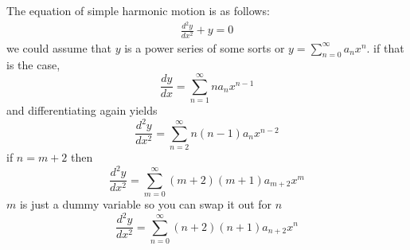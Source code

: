 \documentclass[12pt]{article}
\begin{document}
The equation of simple harmonic motion is as follows:
\begin{align*}
    \frac{d^2 y}{d x^2} + y = 0
\end{align*}
we could assume that $y$ is a power series of some sorts or $y = \sum_{n= 0}^{\infty} a_n x^n$. if that is the case, 
$$\frac{dy}{dx} = \sum_{n = 1}^{\infty} na_nx^{n - 1}$$
and differentiating again yields
$$\frac{d^2 y}{d x^2} = \sum_{n = 2}^{\infty} n(n - 1)a_nx^{n - 2}$$
if $n = m + 2$ then
$$\frac{d^2 y}{d x^2} = \sum_{m = 0}^{\infty} (m + 2)(m + 1)a_{m + 2}x^{m}$$
$m$ is just a dummy variable so you can swap it out for $n$
$$\frac{d^2 y}{d x^2} = \sum_{n = 0}^{\infty} (n + 2)(n + 1)a_{n + 2}x^{n}$$
\end{document}
